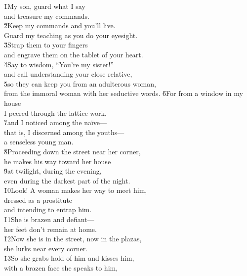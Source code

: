 \begin{poetry}
\poeml {}
\v{1}My son, guard what I say \\
\poeml and treasure my commands. \\
\poeml \v{2}Keep my commands and you'll live. \\
\poemll    Guard my teaching as you do your eyesight. \\
\poeml \v{3}Strap them to your fingers \\
\poemll    and engrave them on the tablet of your heart. \\
\poeml \v{4}Say to wisdom, ``You're my sister!'' \\
\poemll    and call understanding your close relative, \\
\poeml \v{5}so they can keep you from an adulterous woman, \\
\poemll    from the immoral woman with her seductive words.
\poeml \v{6}For from a window in my house \\
\poemll    I peered through the lattice work, \\
\poeml \v{7}and I noticed among the na\"{i}ve--- \\
\poemll    that is, I discerned among the youths--- \\
\poemlll       a senseless young man. \\
\poeml \v{8}Proceeding down the street near her corner, \\
\poemll    he makes his way toward her house \\
\poeml \v{9}at twilight, during the evening, \\
\poemll    even during the darkest part of the night. \\
\poeml \v{10}Look! A woman makes her way to meet him, \\
\poemll    dressed as a prostitute \\
\poemlll       and intending to entrap him. \\
\poeml \v{11}She is brazen and defiant--- \\
\poemll    her feet don't remain at home. \\
\poeml \v{12}Now she is in the street, now in the plazas, \\
\poemll    she lurks near every corner. \\
\poeml \v{13}So she grabs hold of him and kisses him, \\
\poemll    with a brazen face she speaks to him, \\

\end{poetry}
